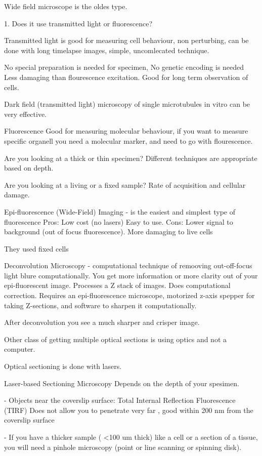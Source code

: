 \documentclass[twocolumn]{article}
\begin{document}
Wide field microscope is the oldes type. 

1. Does it use transmitted light or fluorescence?

Transmitted light is
good for measuring cell behaviour, non perturbing, can be done with long timelapse images, simple, uncomlecated technique.

No special preparation is needed for specimen, 
No  genetic encoding is needed
Less damaging than flourescence excitation.
Good for long term observation of cells.

Dark field (transmitted light) microscopy of single microtubules in vitro can be very effective.
 
Fluorescence
Good for measuring molecular behaviour, if you want to measure specific organell you need a molecular marker, and need to go with flourescence.

Are you looking at a thick or thin specimen? Different techniques are appropriate based on depth.

Are you looking at a living or a fixed sample? Rate of acquisition and cellular damage.

Epi-fluorescence (Wide-Field) Imaging - is the easiest and simplest type of fluorescence 
Pros:
Low cost (no lasers)
Easy to use.
Cons:
Lower signal to background (out of focus fluorescence).
More damaging to live cells

They used fixed cells

Deconvolution Microscopy - computational technique of remooving out-off-focus light blure computationally. You get more information or more clarity out of your epi-fluorescent image.
Processes a Z stack of images. Does computational correction. Requires an epi-fluorescence microscope, motorized z-axis spepper for taking Z-sections, and software to sharpen it computationally.

After deconvolution you see a much sharper and crisper image. 

Other class of getting multiple optical sections is using optics and not a computer. 

Optical sectioning is done with lasers. 

Laser-based Sectioning Microscopy
Depends on the depth of your spesimen.

- Objects near the coverslip surface:
Total Internal Reflection Fluorescence (TIRF)
Does not allow you to penetrate very far , good within 200 nm from the coverslip surface

- If you have a thicker sample ( <100 um thick) like a cell or a section of a tissue, you will need a pinhole microscopy (point or line scanning or spinning disk).
\end{document}
